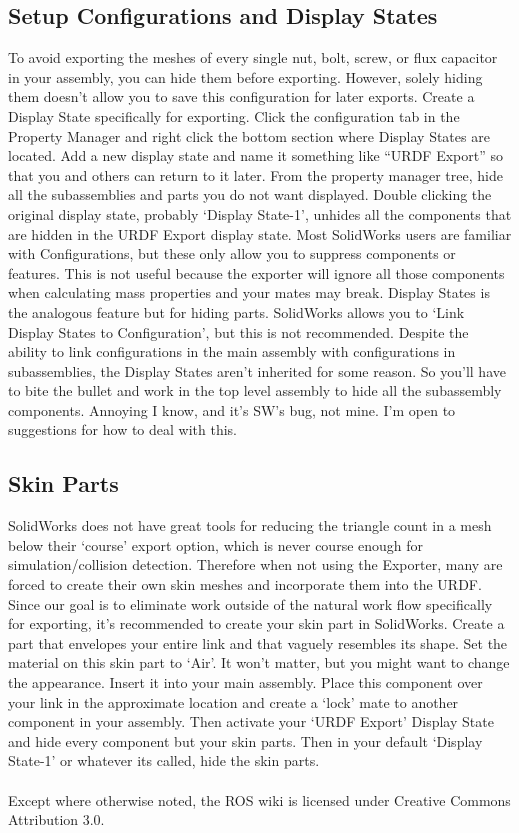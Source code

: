 \subsection{Setup Configurations and Display States}
To avoid exporting the meshes of every single nut, bolt, screw, or flux capacitor in your assembly, you can hide them before exporting. However, solely hiding them doesn't allow you to save this configuration for later exports. 
Create a Display State specifically for exporting. Click the configuration tab in the Property Manager and right click the bottom section where Display States are located. Add a new display state and name it something like ``URDF Export'' so that you and others can return to it later. From the property manager tree, hide all the subassemblies and parts you do not want displayed. Double clicking the original display state, probably `Display State-1', unhides all the components that are hidden in the URDF Export display state. 
Most SolidWorks users are familiar with Configurations, but these only allow you to suppress components or features. This is not useful because the exporter will ignore all those components when calculating mass properties and your mates may break. Display States is the analogous feature but for hiding parts. 
SolidWorks allows you to `Link Display States to Configuration', but this is not recommended. Despite the ability to link configurations in the main assembly with configurations in subassemblies, the Display States aren't inherited for some reason. So you'll have to bite the bullet and work in the top level assembly to hide all the subassembly components. Annoying I know, and it's SW's bug, not mine. I'm open to suggestions for how to deal with this. 

\subsection{Skin Parts}
SolidWorks does not have great tools for reducing the triangle count in a mesh below their `course' export option, which is never course enough for simulation/collision detection. Therefore when not using the Exporter, many are forced to create their own skin meshes and incorporate them into the URDF. Since our goal is to eliminate work outside of the natural work flow specifically for exporting, it's recommended to create your skin part in SolidWorks. 
Create a part that envelopes your entire link and that vaguely resembles its shape. Set the material on this skin part to `Air'. It won't matter, but you might want to change the appearance. Insert it into your main assembly. Place this component over your link in the approximate location and create a `lock' mate to another component in your assembly. Then activate your `URDF Export' Display State and hide every component but your skin parts. Then in your default `Display State-1' or whatever its called, hide the skin parts. 
\\
\\
Except where otherwise noted, the ROS wiki is licensed under Creative Commons Attribution 3.0.